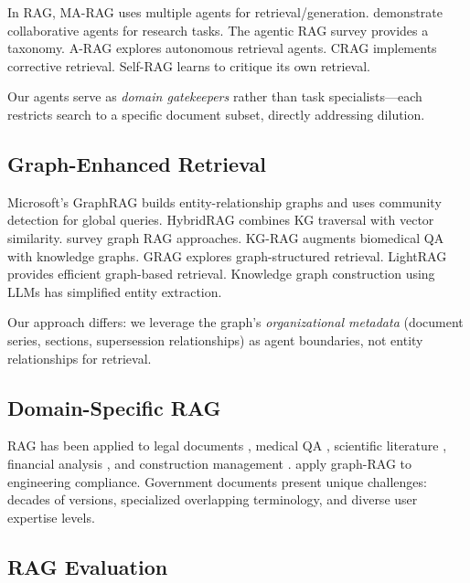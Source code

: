 \documentclass[11pt,a4paper]{article}
\begin{document}
In RAG, MA-RAG \cite{marag2025} uses multiple agents for retrieval/generation. \citet{multiagentrag2024} demonstrate collaborative agents for research tasks. The agentic RAG survey \cite{singh2025agenticrag} provides a taxonomy. A-RAG \cite{arag2026} explores autonomous retrieval agents. CRAG \cite{yan2024crag} implements corrective retrieval. Self-RAG \cite{asai2023selfrag} learns to critique its own retrieval.

Our agents serve as \textit{domain gatekeepers} rather than task specialists---each restricts search to a specific document subset, directly addressing dilution.

\subsection{Graph-Enhanced Retrieval}

Microsoft's GraphRAG \cite{edge2024graphrag} builds entity-relationship graphs and uses community detection for global queries. HybridRAG \cite{hybridrag2024} combines KG traversal with vector similarity. \citet{peng2024graphragsurvey} survey graph RAG approaches. KG-RAG \cite{soman2024kgrag} augments biomedical QA with knowledge graphs. GRAG \cite{grag2024} explores graph-structured retrieval. LightRAG \cite{guo2024lightrag} provides efficient graph-based retrieval. Knowledge graph construction using LLMs \cite{pan2024kgllm, trajanoska2023kgconstruction} has simplified entity extraction.

Our approach differs: we leverage the graph's \textit{organizational metadata} (document series, sections, supersession relationships) as agent boundaries, not entity relationships for retrieval.

\subsection{Domain-Specific RAG}

RAG has been applied to legal documents \cite{louis2024interpretable, pipitone2024legalrag}, medical QA \cite{xiong2024benchmarking, zakka2024almanac}, scientific literature \cite{press2023measuring}, financial analysis \cite{li2024finrag}, and construction management \cite{rag4cm2025}. \citet{graphragcompliance2024} apply graph-RAG to engineering compliance. Government documents present unique challenges: decades of versions, specialized overlapping terminology, and diverse user expertise levels.

\subsection{RAG Evaluation}
\end{document}
